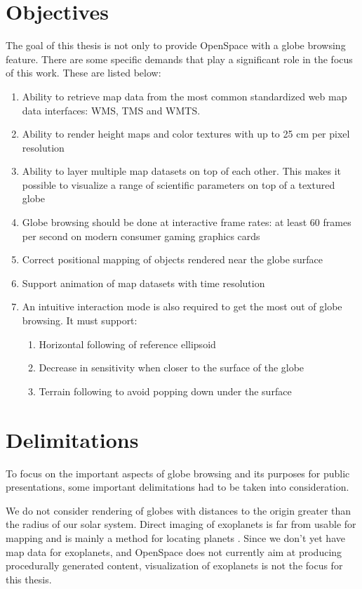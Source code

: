 \section{Objectives}

The goal of this thesis is not only to provide OpenSpace with a globe browsing feature. There are some specific demands that play a significant role in the focus of this work. These are listed below:

\begin{enumerate}
    \item Ability to retrieve map data from the most common standardized web map data interfaces: WMS, TMS and WMTS.
    \item Ability to render height maps and color textures with up to 25 cm per pixel resolution
    \item Ability to layer multiple map datasets on top of each other. This makes it possible to visualize a range of scientific parameters on top of a textured globe
    \item Globe browsing should be done at interactive frame rates: at least 60 frames per second on modern consumer gaming graphics cards
    \item Correct positional mapping of objects rendered near the globe surface
    \item Support animation of map datasets with time resolution
    \item An intuitive interaction mode is also required to get the most out of globe browsing. It must support:
	\begin{enumerate}
    		\item Horizontal following of reference ellipsoid
		\item Decrease in sensitivity when closer to the surface of the globe
		\item Terrain following to avoid popping down under the surface
	\end{enumerate}
\end{enumerate}

\section{Delimitations}

To focus on the important aspects of globe browsing and its purposes for public presentations, some important delimitations had to be taken into consideration.

We do not consider rendering of globes with distances to the origin greater than the radius of our solar system. Direct imaging of exoplanets is far from usable for mapping and is mainly a method for locating planets \cite{exoplanets}. Since we don't yet have map data for exoplanets, and OpenSpace does not currently aim at producing procedurally generated content, visualization of exoplanets is not the focus for this thesis.

